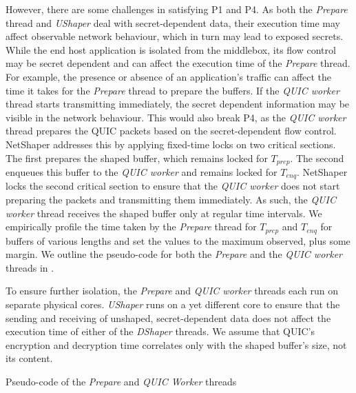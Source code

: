 However, there are some challenges in satisfying P1 and P4.
As both the \textit{Prepare} thread and \textit{UShaper} deal with secret-dependent data, their execution time may affect observable network behaviour, which in turn may lead to exposed secrets.
While the end host application is isolated from the middlebox, its flow control may be secret dependent and can affect the execution time of the \textit{Prepare} thread.
For example, the presence or absence of an application's traffic can affect the time it takes for the \textit{Prepare} thread to prepare the buffers.
If the \textit{QUIC worker} thread starts transmitting immediately, the secret dependent information may be visible in the network behaviour. 
This would also break P4, as the \textit{QUIC worker} thread prepares the QUIC packets based on the secret-dependent flow control.
NetShaper addresses this by applying fixed-time locks on two critical sections.
The first prepares the shaped buffer, which remains locked for $T_{prep}$.
The second enqueues this buffer to the \textit{QUIC worker} and remains locked for $T_{enq}$.
NetShaper locks the second critical section to ensure that the \textit{QUIC worker} does not start preparing the packets and transmitting them immediately.
As such, the \textit{QUIC worker} thread receives the shaped buffer only at regular time intervals.
We empirically profile the time taken by the \textit{Prepare} thread for $T_{prep}$ and $T_{enq}$ for buffers of various lengths and set the values to the maximum observed, plus some margin.
We outline the pseudo-code for both the \textit{Prepare} and the \textit{QUIC worker} threads in .
\vspace{1em}

To ensure further isolation, the \textit{Prepare} and \textit{QUIC worker} threads each run on separate physical cores.
\textit{UShaper} runs on a yet different core to ensure that the sending and receiving of unshaped, secret-dependent data does not affect the execution time of either of the \textit{DShaper} threads.
We assume that QUIC's encryption and decryption time correlates only with the shaped buffer's size, not its content.

\begin{minipage}{\textwidth}

\captionsetup{type=lstlisting}
\caption{Pseudo-code of the \textit{Prepare} and \textit{QUIC Worker} threads}
\label{lst:prepare_and_worker}
\end{minipage}

\vspace{1em}
